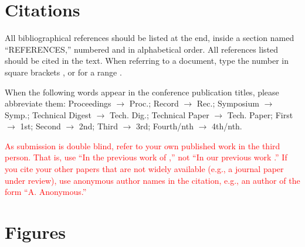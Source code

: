 \documentclass{article}
\begin{document}
\section{Citations}

All bibliographical references should be listed at the end,
inside a section named ``REFERENCES,'' numbered and in alphabetical order.
All references listed should be cited in the text.
When referring to a document, type the number in square brackets
\cite{Author:00}, or for a range \cite{Author:00,Someone:10,Someone:04}.

When the following words appear in the conference publication titles, please abbreviate them: Proceedings $\rightarrow$ Proc.; Record $\rightarrow$ Rec.; Symposium $\rightarrow$ Symp.; Technical Digest $\rightarrow$ Tech. Dig.; Technical Paper $\rightarrow$ Tech. Paper; First $\rightarrow$ 1st; Second $\rightarrow$ 2nd; Third $\rightarrow$ 3rd; Fourth/nth $\rightarrow$ 4th/nth.

\textcolor{red}{As submission is double blind, refer to your own published work in the third person. That is, use ``In the previous work of \cite{Someone:10},'' not ``In our previous work \cite{Someone:10}.'' If you cite your other papers that are not widely available (e.g., a journal paper under review), use anonymous author names in the citation, e.g., an author of the form ``A. Anonymous.''}

\section{Figures}
\end{document}
